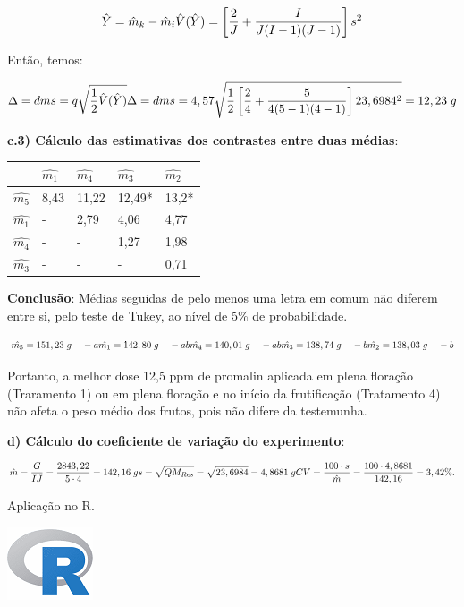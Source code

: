 \documentclass[
]{book}
\begin{document}
\[
\hat{Y} = \hat{m}_k-\hat{m}_{i} \\
\hat{V}(\hat{Y})=\left[\frac{2}{J}+\frac{I}{J(I-1)(J-1)} \right]s^2
\]

Então, temos:

\[
\Delta = dms =q\sqrt{\frac{1}{2}\hat{V}(\hat{Y})} \\
\Delta = dms =4,57\sqrt{\frac{1}{2}\left[\frac{2}{4}+\frac{5}{4(5-1)(4-1)} \right]23,6984^2}=12,23\;g
\]

\textbf{c.3) Cálculo das estimativas dos contrastes entre duas médias}:

\begin{longtable}[]{@{}lllll@{}}
\toprule
& \(\hat{m_1}\) & \(\hat{m_4}\) & \(\hat{m_3}\) & \(\hat{m_2}\)\tabularnewline
\midrule
\endhead
\(\hat{m_5}\) & 8,43 & 11,22 & 12,49* & 13,2*\tabularnewline
\(\hat{m_1}\) & - & 2,79 & 4,06 & 4,77\tabularnewline
\(\hat{m_4}\) & - & - & 1,27 & 1,98\tabularnewline
\(\hat{m_3}\) & - & - & - & 0,71\tabularnewline
\bottomrule
\end{longtable}

\textbf{Conclusão}: Médias seguidas de pelo menos uma letra em comum não diferem entre si, pelo teste de Tukey, ao nível de 5\% de probabilidade.

\[
\hat{m_5} = 151,23\;g\;\;\;\;-a\\
\hat{m_1} = 142,80\;g\;\;\;\;-ab\\
\hat{m_4} = 140,01\;g\;\;\;\;-ab\\
\hat{m_3} = 138,74\;g\;\;\;\;-b\\
\hat{m_2} = 138,03\;g\;\;\;\;-b
\]

Portanto, a melhor dose 12,5 ppm de promalin aplicada em plena floração (Traramento 1) ou em plena floração e no início da frutificação (Tratamento 4) não afeta o peso médio dos frutos, pois não difere da testemunha.

\textbf{d) Cálculo do coeficiente de variação do experimento}:

\[
\hat{m}=\frac{G}{IJ}=\frac{2843,22}{5\cdot4}=142,16\;g\\
s=\sqrt{QM_{Res}}=\sqrt{23,6984}=4,8681\;g\\
CV=\frac{100\cdot s}{\hat{m}}=\frac{100\cdot4,8681}{142,16}=3,42\%.
\]

Aplicação no R.

\includegraphics{R.png}
\end{document}
